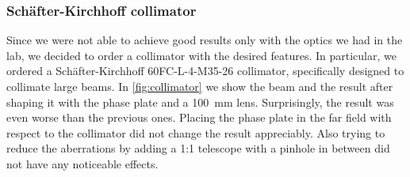 \subsubsection{Schäfter-Kirchhoff collimator}
Since we were not able to achieve good results only with the optics we had in the lab, we decided to order a collimator with the desired features. In particular, we ordered a Schäfter-Kirchhoff 60FC-L-4-M35-26 collimator, specifically designed to collimate large beams. In \cref{fig:collimator} we show the beam and the result after shaping it with the phase plate and a \SI{100}{mm} lens. Surprisingly, the result was even worse than the previous ones. Placing the phase plate in the far field with respect to the collimator did not change the result appreciably. Also trying to reduce the aberrations by adding a 1:1 telescope with a pinhole in between did not have any noticeable effects.

